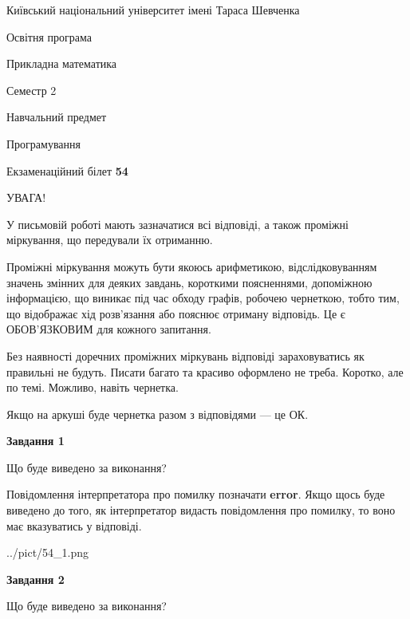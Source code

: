 \documentclass[12pt, ukrainian]{article}
\begin{document}
{{\begin {small}\par
{ \center  Київський національний університет імені Тараса Шевченка \par}
{\parbox {5 cm}{Освітня програма \hfill}{\parbox {7 cm}{Прикладна математика \hfill}}\parbox {6 cm}{\hfill Семестр 2}}\par
{\parbox {5 cm} {Навчальний предмет \hfill}\parbox {7 cm}{Програмування \hfill}\parbox {6cm}{\hfill}\par}\vspace{-7pt} \end{small}}{\center Екзаменаційний білет \No \textbf
{ 54 }\par}}
{
\begin {large}
УВАГА!

У письмовій роботі мають зазначатися всі відповіді, а також проміжні міркування, що передували їх отриманню.

Проміжні міркування можуть бути якоюсь арифметикою, відслідковуванням зна\-чень змінних для деяких завдань,
короткими поясненнями, допоміжною інформацією, що виникає під час обходу графів, робочею чернеткою,
тобто тим, що відображає хід розв’язання або пояснює отриману відповідь.
Це є ОБОВ’ЯЗКОВИМ для кожного запитання.

Без наявності доречних проміжних міркувань відповіді зараховуватись як правиль\-ні не будуть.
Писати багато та красиво оформлено не треба. Коротко, але по темі. Можли\-во, навіть чернетка.

Якщо на аркуші буде чернетка разом з відповідями --- це ОК.

\newpage

{\begin {center}\textbf{Завдання 1}\end {center}}\par
Що буде виведено за виконання?

Повідомлення інтерпретатора про помилку позначати \textbf{error}.
Якщо щось буде виведено до того, як інтерпретатор видасть повідомлення про помилку, 
то воно має вказуватись у відповіді. \par


\begin{center}
	{../pict/54_1.png}
\end{center}
\newpage

{\begin {center}\textbf{Завдання 2}\end {center}}\par
Що буде виведено за виконання?


\end{large}}
\end{document}
